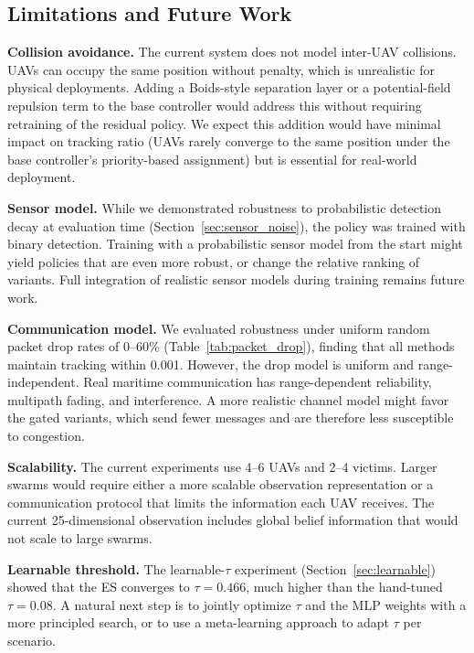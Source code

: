 \documentclass[journal]{IEEEtran}
\begin{document}
\subsection{Limitations and Future Work}

\textbf{Collision avoidance.} The current system does not model inter-UAV collisions.
UAVs can occupy the same position without penalty, which is unrealistic for physical
deployments. Adding a Boids-style separation layer \cite{boids} or a potential-field
repulsion term to the base controller would address this without requiring retraining
of the residual policy. We expect this addition would have minimal impact on tracking
ratio (UAVs rarely converge to the same position under the base controller's
priority-based assignment) but is essential for real-world deployment.

\textbf{Sensor model.} While we demonstrated robustness to probabilistic detection
decay at evaluation time (Section~\ref{sec:sensor_noise}), the policy was trained
with binary detection. Training with a probabilistic sensor model from the start might
yield policies that are even more robust, or change the relative ranking of variants.
Full integration of realistic sensor models during training remains future work.

\textbf{Communication model.} We evaluated robustness under uniform random packet
drop rates of 0--60\% (Table~\ref{tab:packet_drop}), finding that all methods
maintain tracking within 0.001. However, the drop model is uniform and
range-independent. Real maritime communication has range-dependent reliability,
multipath fading, and interference. A more realistic channel model might favor the
gated variants, which send fewer messages and are therefore less susceptible to
congestion.

\textbf{Scalability.} The current experiments use 4--6 UAVs and 2--4 victims. Larger
swarms would require either a more scalable observation representation or a
communication protocol that limits the information each UAV receives. The current
25-dimensional observation includes global belief information that would not scale
to large swarms.

\textbf{Learnable threshold.} The learnable-$\tau$ experiment (Section~\ref{sec:learnable})
showed that the ES converges to $\tau = 0.466$, much higher than the hand-tuned
$\tau = 0.08$. A natural next step is to jointly optimize $\tau$ and the MLP weights
with a more principled search, or to use a meta-learning approach to adapt $\tau$
per scenario.
\end{document}
